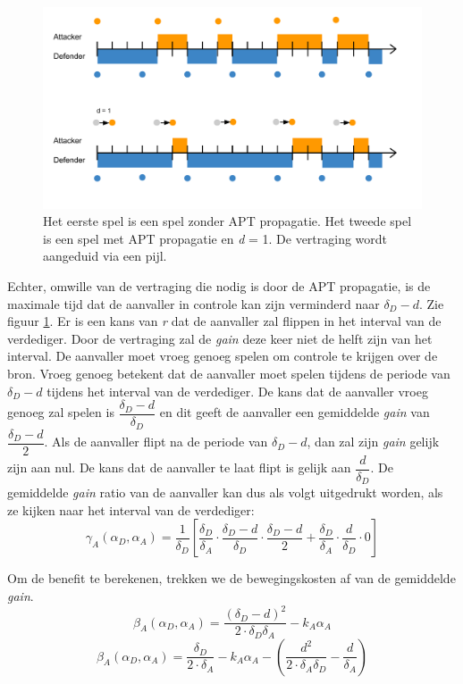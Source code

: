 \documentclass[master=cws, masteroption=vs,english]{kulemt}
\begin{document}
\begin{abstract*}
\begin{figure}[hbtp]
\centering
\includegraphics[scale=0.5]{../../doc/template/Images/FLipItCase1.pdf}
\caption{Het eerste spel is een spel zonder APT propagatie. Het tweede spel is een spel met APT propagatie en \textit{d} = 1. De vertraging wordt aangeduid via een pijl.}
\label{fig:delaycase1}
\end{figure}


Echter, omwille van de vertraging die nodig is door de APT propagatie, is de maximale tijd dat de aanvaller in controle kan zijn verminderd naar $\delta_{D}-d$. Zie figuur \ref{fig:delaycase1}.  Er is een kans van \textit{r} dat de aanvaller zal flippen in het interval van de verdediger. Door de vertraging zal de \textit{gain} deze keer niet de helft zijn van het interval. De aanvaller moet vroeg genoeg spelen om controle te krijgen over de bron. Vroeg genoeg betekent dat de aanvaller moet spelen tijdens de periode van $\delta_{D}-d$ tijdens het interval van de verdediger. De kans dat de aanvaller vroeg genoeg zal spelen is $\dfrac{\delta_{D}-d}{\delta_{D}}$ en dit geeft de aanvaller een gemiddelde \textit{gain} van $\dfrac{\delta_{D}-d}{2}$. Als de aanvaller flipt na de periode van $\delta_{D}-d$, dan zal zijn \textit{gain} gelijk zijn aan nul. De kans dat de aanvaller te laat flipt is gelijk aan $\dfrac{d}{\delta_{D}}$. De gemiddelde \textit{gain} ratio van de aanvaller kan dus als volgt uitgedrukt worden, als ze kijken naar het interval van de verdediger:
\begin{equation}\label{first}
\gamma_{A}(\alpha_{D},\alpha_{A}) = \dfrac {1}{\delta_{D}} [ \dfrac{\delta_{D}}{\delta_{A}} \cdot \dfrac{\delta_{D}-d}{\delta_{D}} \cdot \dfrac{\delta_{D}-d}{2} + \dfrac{\delta_{D}}{\delta_{A}} \cdot \dfrac{d}{\delta_{D}} \cdot 0 ]
\end{equation}

Om de benefit te berekenen, trekken we de bewegingskosten af van de gemiddelde \textit{gain}.
\begin{equation}\label{first}
\beta_{A}(\alpha_{D},\alpha_{A}) = \dfrac { (\delta_{D}-d) ^{2}} {2 \cdot \delta_{D}  \delta_{A}} - k_{A} \alpha_{A}
\end{equation}
\begin{equation}\label{first}
\beta_{A}(\alpha_{D},\alpha_{A}) = \dfrac { \delta_{D}} {2 \cdot \delta_{A}} - k_{A} \alpha_{A} - ( \dfrac{d^{2}}{2 \cdot \delta_{A} \delta_{D}} - \dfrac{d}{\delta_{A}} )
\end{equation}
 

\end{abstract*}
\end{document}
